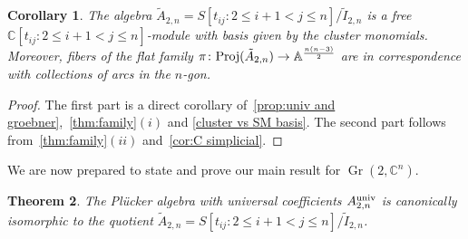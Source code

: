\documentclass[10pt,a4paper]{amsart}
\newcommand{\thlabel}[1]{\label{#1}}
\newcommand{\thref}[1]{\ref{#1}}
\newtheorem{Theorem}{Theorem}[section]
\newtheorem{Corollary}[Theorem]{Corollary}
\numberwithin{equation}{section}
\DeclareMathOperator{\Gr}{Gr}
\begin{document}
\begin{Corollary}\thlabel{2n SMB}
The algebra $\tilde A_{2,n}=S[t_{ij}\colon 2\le i+1<j\le n]/\tilde I_{2,n}$ is a free $\mathbb C[t_{ij}\colon 2\le i+1<j\le n]$-module with basis given by the cluster monomials.
Moreover, fibers of the flat family $\pi\colon {\rm Proj}(\tilde A_{2,n})\to \mathbb A^{\frac{n(n-3)}{2}}$ are in correspondence with collections of arcs in the $n$-gon.
\end{Corollary}

\begin{proof}
The first part is a direct corollary of~\thref{prop:univ and groebner},~\thref{thm:family}$(i)$ and
\thref{cluster vs SM basis}.
The second part follows from~\thref{thm:family}$(ii)$ and~\thref{cor:C simplicial}.
\end{proof}

We are now prepared to state and prove our main result for $\Gr(2,\mathbb C^n)$.

\begin{Theorem}\thlabel{thm:A univ as quotient}
The Pl\"ucker algebra with universal coefficients $A_{2,n}^{\rm univ}$ is canonically isomorphic to the quotient $\tilde A_{2,n}=S[t_{ij}\colon 2\le i+1<j\le n]/\tilde I_{2,n}$.
\end{Theorem}
\end{document}
